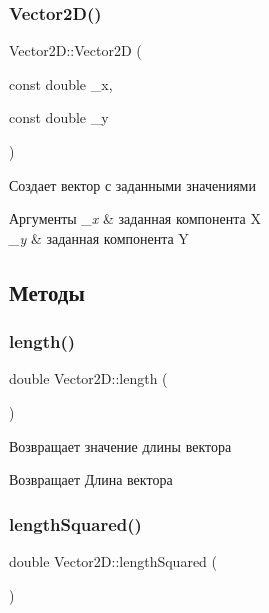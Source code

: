 \subsubsection{\texorpdfstring{Vector2\+D()}{Vector2D()}\hspace{0.1cm}{\footnotesize\ttfamily [2/2]}}
{\footnotesize\ttfamily Vector2\+D\+::\+Vector2D (\begin{DoxyParamCaption}\item[{const double}]{\+\_\+x,  }\item[{const double}]{\+\_\+y }\end{DoxyParamCaption})}

Создает вектор с заданными значениями 
\begin{DoxyParams}{Аргументы}
{\em \+\_\+x} & заданная компонента X \\
\hline
{\em \+\_\+y} & заданная компонента Y \\
\hline
\end{DoxyParams}


\subsection{Методы}
\mbox{\label{class_vector2_d_a56b4174bc06988a5df894457c09d9677}} 
\subsubsection{\texorpdfstring{length()}{length()}}
{\footnotesize\ttfamily double Vector2\+D\+::length (\begin{DoxyParamCaption}{ }\end{DoxyParamCaption})}

Возвращает значение длины вектора \begin{DoxyReturn}{Возвращает}
Длина вектора 
\end{DoxyReturn}
\mbox{\label{class_vector2_d_a809281a82c36622fc67f96ec4ee2bbbc}} 
\subsubsection{\texorpdfstring{length\+Squared()}{lengthSquared()}}
{\footnotesize\ttfamily double Vector2\+D\+::length\+Squared (\begin{DoxyParamCaption}{ }\end{DoxyParamCaption})}

